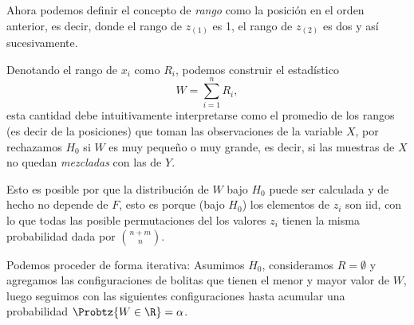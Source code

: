 Ahora podemos definir el concepto de \emph{rango} como la posición en el orden anterior, es decir, donde el rango de $z_{(1)}$ es 1, el rango de $z_{(2)}$ es dos  y así sucesivamente. 


Denotando el rango de $x_i$ como $R_i$, podemos construir el estadístico
\begin{equation}
 	W = \sum_{i=1}^{n}R_i,
 \end{equation} 
esta cantidad debe intuitivamente interpretarse como el promedio de los rangos (es decir de la posiciones) que toman las observaciones de la variable $X$, por rechazamos $H_0$ si $W$ es muy pequeño o muy grande, es decir, si las muestras de $X$ no quedan \emph{mezcladas} con las de $Y$. 

 Esto es posible por que la distribución de $W$ bajo $H_0$ puede ser calculada y de hecho no depende de $F$, esto es porque (bajo $H_0$) los elementos de $z_i$ son iid, con lo que todas las posible permutaciones del los valores $z_i$ tienen la misma probabilidad dada por $\binom{n+m}{n}$.

 \begin{remark}
 	Podemos proceder de forma iterativa: Asumimos $H_0$, consideramos $R=\emptyset$ y agregamos las configuraciones de bolitas que tienen el menor y mayor valor de $W$, luego seguimos con las siguientes configuraciones hasta acumular una probabilidad $\Probtz{W\in\R} = \alpha$.
 \end{remark}
 
